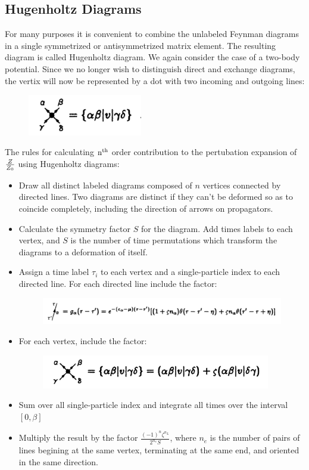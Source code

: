 \documentclass[12pt]{article}
\begin{document}
\subsection*{Hugenholtz Diagrams}
For many purposes it is convenient to combine the unlabeled Feynman diagrams in a 
single symmetrized or antisymmetrized matrix element. The resulting diagram is 
called Hugenholtz diagram. We again consider the case of a two-body potential. 
Since we no longer wish to distinguish direct and exchange diagrams, the vertix 
will now be represented by a dot with two incoming and outgoing lines:
\begin{figure}[H]
    \centering
    \includegraphics[width=5cm]{p7.png}
    \caption*{}
    \label{}
\end{figure}
The rules for calculating $\rm n^{th}$ order contribution to the pertubation expansion 
of $\tiny \frac{Z}{Z_0}$ using Hugenholtz diagrams:
\begin{itemize}
    \item Draw all distinct labeled diagrams composed of $n$ vertices connected 
    by directed lines. Two diagrams are distinct if they can't be deformed so as 
    to coincide completely, including the direction of arrows on propagators.
    \item Calculate the symmetry factor $S$ for the diagram. Add times labels to each 
    vertex, and $S$ is the number of time permutations which transform the diagrams 
    to a deformation of itself.
    \item Assign a time label $\tau_i$ to each vertex and a single-particle index to 
    each directed line. For each directed line include the factor:
    \begin{figure}[H]
        \centering
        \includegraphics[width=15cm]{p3.png}
        \caption*{}
        \label{}
    \end{figure}
    \item For each vertex, include the factor:
    \begin{figure}[H]
        \centering
        \includegraphics[width=10cm]{p10.png}
        \caption*{}
        \label{}
    \end{figure}
    \item Sum over all single-particle index and integrate all times over the 
    interval $[0,\beta]$
    \item Multiply the result by the factor $\frac{(-1)^n\zeta^{n_L}}{2^{n_e}S}$,
    where $n_e$ is the number of pairs of lines begining at the same vertex,  
    terminating at the same end, and oriented in the same direction. 
\end{itemize}
\end{document}
